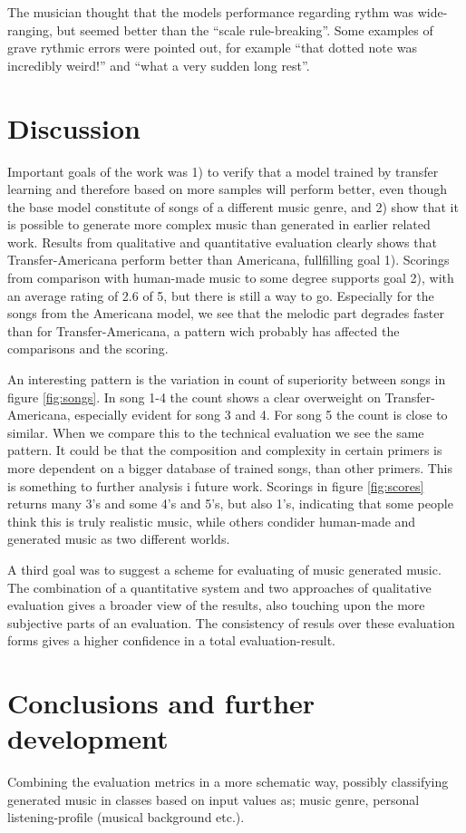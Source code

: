 \documentclass{IEEEtran}
\begin{document}
The musician thought that the models performance regarding rythm 
was wide-ranging, but seemed better than the ``scale rule-breaking''.
Some examples of grave rythmic errors were pointed out, for example
``that dotted note was incredibly weird!'' and  ``what a very sudden 
long rest''.

\section{Discussion}

Important goals of the work was 1) to verify that a model trained by transfer
learning and therefore based on more samples will perform better, even though
the base model constitute of songs of a different music genre, and 2) show
that it is possible to generate more complex music than generated in earlier
related work. Results from qualitative and quantitative evaluation clearly
shows that Transfer-Americana perform better than Americana, fullfilling goal
1). Scorings from comparison with human-made music to some degree supports
goal 2), with an average rating of 2.6 of 5, but there is still a way to go.
Especially for the songs from the Americana model, we see that the melodic
part degrades faster than for Transfer-Americana, a pattern wich probably has
affected the comparisons and the scoring.

An interesting pattern is the variation in count of superiority between songs
in figure \ref{fig:songs}. In song 1-4 the count shows a clear overweight on
Transfer-Americana, especially evident for song 3 and 4. For song 5 the count
is close to similar. When we compare this to the technical evaluation we see
the same pattern. It could be that the composition and complexity in
certain primers is more dependent on a bigger database of trained songs, than
other primers. This is something to further analysis i future work. Scorings
in figure \ref{fig:scores} returns many 3's and some 4's and 5's, but also
1's, indicating that some people think this is truly realistic music, while
others condider human-made and generated music as two different worlds.

A third goal was to suggest a scheme for evaluating of music generated music.
The combination of a quantitative system and two approaches of qualitative
evaluation gives a broader view of the results, also touching upon the more
subjective parts of an evaluation. The consistency of resuls over these
evaluation forms gives a higher confidence in a total evaluation-result.


\section{Conclusions and further development}

Combining the evaluation
metrics in a more schematic way, possibly classifying generated music in
classes based on input values as; music genre, personal listening-profile
(musical background etc.).

\vfill

\pagebreak

\printbibliography
\end{document}
